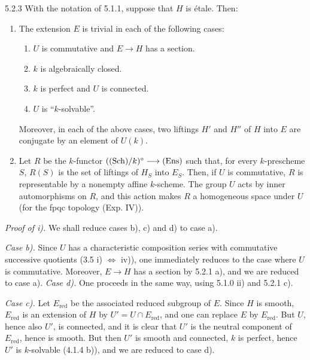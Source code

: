 \begin{lemma}{5.2.3}\label{XVII.5.2.3}
With the notation of 5.1.1, suppose that $H$ is étale. Then:
\begin{enumerate}[label=\textup{\roman*)}]
\item The extension $E$ is trivial in each of the following cases:
\begin{enumerate}[label=\textup{\alph*)}]
\item $U$ is commutative and $E\to H$ has a section.
\item $k$ is algebraically closed.
\item $k$ is perfect and $U$ is connected.
\item $U$ is ``$k$-solvable''.
\end{enumerate}
Moreover, in each of the above cases, two liftings $H'$ and $H''$ of $H$ into $E$ are conjugate by an element of $U(k)$.
\item Let $R$ be the $k$-functor $(\textup{(Sch)}/k)^\circ\longrightarrow\textup{(Ens)}$ such that, for every $k$-prescheme $S$, $R(S)$ is the set of liftings of $H_S$ into $E_S$. Then, if $U$ is commutative, $R$ is representable by a nonempty affine $k$-scheme. The group $U$ acts by inner automorphisms on $R$, and this action makes $R$ a homogeneous space under $U$ (for the fpqc topology (\cf Exp. IV)).
\end{enumerate}
\end{lemma}
\noindent\emph{Proof of i).} We shall reduce cases b), c) and d) to case a).

\noindent\emph{Case b).} Since $U$ has a characteristic composition series with commutative successive quotients (3.5 i) $\Leftrightarrow$ iv)), one immediately reduces to the case where $U$ is commutative. Moreover, $E\to H$ has a section by 5.2.1 a), and we are reduced to case a).
\noindent\emph{Case d).} One proceeds in the same way, using 5.1.0 ii) and 5.2.1 c).

\noindent\emph{Case c).} Let $E_{\mathrm{red}}$ be the associated reduced subgroup of $E$. Since $H$ is smooth, $E_{\mathrm{red}}$ is an extension of $H$ by $U'=U\cap E_{\mathrm{red}}$, and one can replace $E$ by $E_{\mathrm{red}}$. But $U$, hence also $U'$, is connected, and it is clear that $U'$ is the neutral component of $E_{\mathrm{red}}$, hence is smooth. But then $U'$ is smooth and connected, $k$ is perfect, hence $U'$ is $k$-solvable (4.1.4 b)), and we are reduced to case d).

